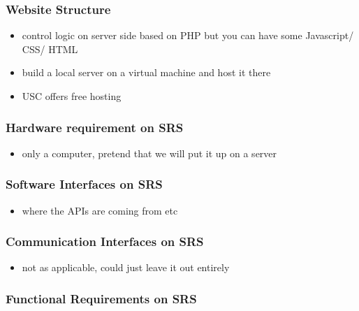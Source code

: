 \documentclass[]{article}
\begin{document}
\subsubsection{Website Structure}\label{website-structure}

\begin{itemize}
\itemsep1pt\parskip0pt
\item
  control logic on server side based on PHP but you can have some
  Javascript/ CSS/ HTML
\item
  build a local server on a virtual machine and host it there
\item
  USC offers free hosting
\end{itemize}

\subsubsection{Hardware requirement on
SRS}\label{hardware-requirement-on-srs}

\begin{itemize}
\itemsep1pt\parskip0pt
\item
  only a computer, pretend that we will put it up on a server
\end{itemize}

\subsubsection{Software Interfaces on
SRS}\label{software-interfaces-on-srs}

\begin{itemize}
\itemsep1pt\parskip0pt
\item
  where the APIs are coming from etc
\end{itemize}

\subsubsection{Communication Interfaces on
SRS}\label{communication-interfaces-on-srs}

\begin{itemize}
\itemsep1pt\parskip0pt
\item
  not as applicable, could just leave it out entirely
\end{itemize}

\subsubsection{Functional Requirements on
SRS}\label{functional-requirements-on-srs}
\end{document}
